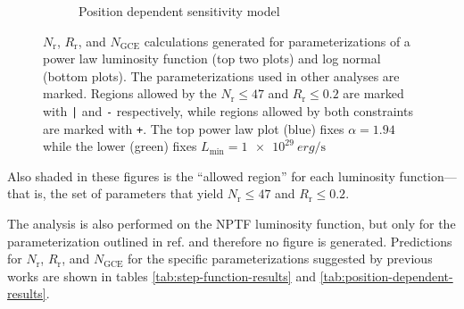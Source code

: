 \documentclass[a4paper,11pt]{article}
\begin{document}
\begin{figure}
\begin{subfigure}[b]{0.49\textwidth}
        \caption{Position dependent sensitivity model}
        \label{fig:position-dependent}
    \end{subfigure}
    \caption{$N_\text{r}$, $R_\text{r}$, and $N_\text{GCE}$ calculations generated for parameterizations of a power law luminosity function (top two plots) and log normal (bottom plots). The parameterizations used in other analyses are marked. Regions allowed by the $N_\text{r} \leq 47$ and $R_\text{r} \leq 0.2$ are marked with \texttt{|} and \texttt{-} respectively, while regions allowed by both constraints are marked with \texttt{+}. The top power law plot (blue) fixes $\alpha=1.94$ while the lower (green) fixes $L_\text{min}=\SI{1e29}{erg\per\second}$ }
\end{figure}

Also shaded in these figures is the ``allowed region'' for each luminosity function---that is, the set of parameters that yield $N_\text{r} \leq 47$ and $R_\text{r} \leq 0.2$.

The analysis is also performed on the NPTF luminosity function, but only for the parameterization outlined in ref. \cite{Lee:2015fea} and therefore no figure is generated. Predictions for $N_\text{r}$, $R_\text{r}$, and $N_\text{GCE}$ for the specific parameterizations suggested by previous works are shown in tables \ref{tab:step-function-results} and \ref{tab:position-dependent-results}.
\end{document}
